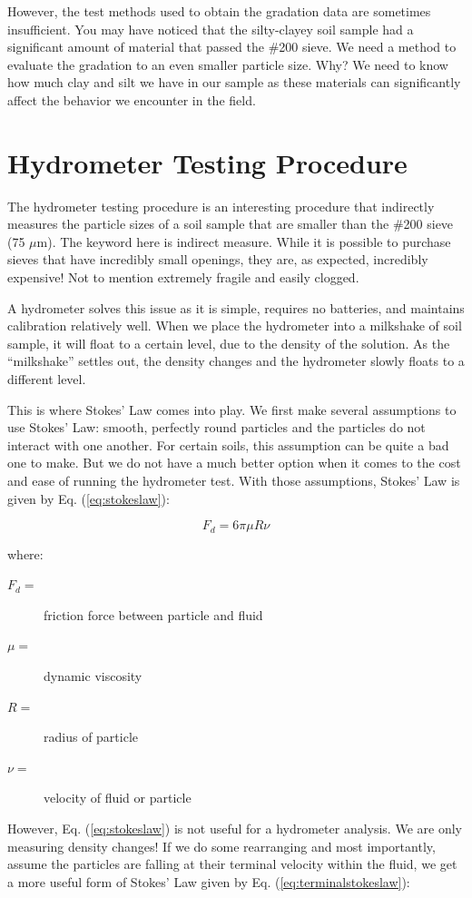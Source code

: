 \documentclass[12pt]{article}
\begin{document}
However, the test methods used to obtain the gradation data are sometimes insufficient. You may have noticed that the silty-clayey soil sample had a significant amount of material that passed the \#200 sieve. We need a method to evaluate the gradation to an even smaller particle size. Why? We need to know how much clay and silt we have in our sample as these materials can significantly affect the behavior we encounter in the field.

\pagebreak
\section{Hydrometer Testing Procedure}
The hydrometer testing procedure is an interesting procedure that indirectly measures the particle sizes of a soil sample that are smaller than the \#200 sieve (75 $\mu$m). The keyword here is indirect measure. While it is possible to purchase sieves that have incredibly small openings, they are, as expected, incredibly expensive! Not to mention extremely fragile and easily clogged.

A hydrometer solves this issue as it is simple, requires no batteries, and maintains calibration relatively well. When we place the hydrometer into a milkshake of soil sample, it will float to a certain level, due to the density of the solution. As the ``milkshake'' settles out, the density changes and the hydrometer slowly floats to a different level. 

This is where Stokes' Law comes into play. We first make several assumptions to use Stokes' Law: smooth, perfectly round particles and the particles do not interact with one another. For certain soils, this assumption can be quite a bad one to make. But we do not have a much better option when it comes to the cost and ease of running the hydrometer test. With those assumptions, Stokes' Law is given by Eq. (\ref{eq:stokeslaw}):

\begin{equation}
    F_d=6\pi\mu R\nu
    \label{eq:stokeslaw}
\end{equation}

where:
\begin{description}
\item[$F_d=$] friction force between particle and fluid
\item[$\mu=$] dynamic viscosity
\item[$R=$] radius of particle
\item[$\nu=$] velocity of fluid or particle
\end{description}
However, Eq. (\ref{eq:stokeslaw}) is not useful for a hydrometer analysis. We are only measuring density changes! If we do some rearranging and most importantly, assume the particles are falling at their terminal velocity within the fluid, we get a more useful form of Stokes' Law given by Eq. (\ref{eq:terminalstokeslaw}):
\end{document}
